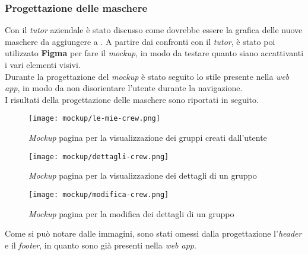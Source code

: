 \subsubsection{Progettazione delle maschere}
Con il \textit{tutor} aziendale è stato discusso come dovrebbe essere la
grafica delle nuove maschere da aggiungere a \productName. A partire dai
confronti con il \textit{tutor}, è stato poi utilizzato \textbf{Figma} per fare
il
\textit{mockup}, in modo da  testare quanto siano accattivanti i vari elementi
visivi.\\
Durante la progettazione del \textit{mockup} è stato seguito lo stile presente
nella \textit{web app}, in modo da non disorientare l'utente durante la
navigazione. \\
I risultati della progettazione delle maschere sono riportati in seguito.
\begin{figure}[H]
    \centerline{\texttt{[image: mockup/le-mie-crew.png]}}
    \caption{\textit{Mockup} pagina per la visualizzazione dei gruppi creati
        dall'utente}
\end{figure}


\begin{figure}[H]
    \centering
    \texttt{[image: mockup/dettagli-crew.png]}
    \caption{\textit{Mockup} pagina per la visualizzazione dei dettagli di un
        gruppo}
\end{figure}

\begin{figure}[H]
    \centering
    \texttt{[image: mockup/modifica-crew.png]}
    \caption{\textit{Mockup} pagina per la modifica dei dettagli di un gruppo}
\end{figure}

Come si può notare dalle immagini, sono stati omessi dalla progettazione
l'\textit{header} e il \textit{footer}, in quanto sono già presenti nella
\textit{web app}.


